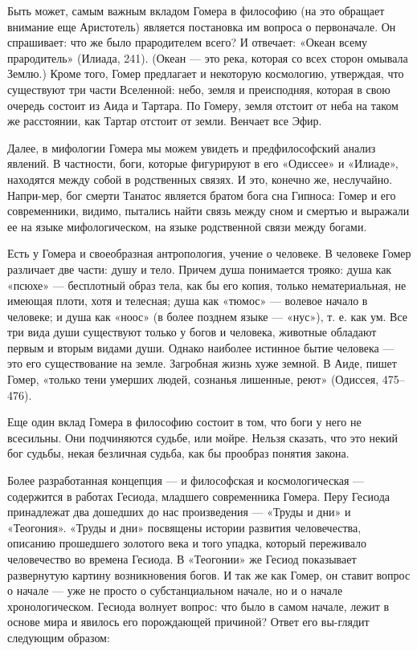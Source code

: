     \par Быть может, самым важным вкладом Гомера в философию (на это обращает внимание еще Аристотель) является постановка им вопроса о первоначале. Он спрашивает: что же было прародителем всего? И отвечает: «Океан всему прародитель» (Илиада, 241). (Океан — это река, которая со всех сторон омывала Землю.) Кроме того, Гомер предлагает и некоторую космологию, утверждая, что существуют три части Вселенной: небо, земля и преисподняя, которая в свою очередь состоит из Аида и Тартара. По Гомеру, земля отстоит от неба на таком же расстоянии, как Тартар отстоит от земли. Венчает все Эфир.
    
    \par Далее, в мифологии Гомера мы можем увидеть и предфилософский анализ явлений. В частности, боги, которые фигурируют в его «Одиссее» и «Илиаде», находятся между собой в родственных связях. И это, конечно же, неслучайно. Напри-мер, бог смерти Танатос является братом бога сна Гипноса: Гомер и его современники, видимо, пытались найти связь между сном и смертью и выражали ее на языке мифологическом, на языке родственной связи между богами.
    
    \par Есть у Гомера и своеобразная антропология, учение о человеке. В человеке Гомер различает две части: душу и тело. Причем душа понимается трояко: душа как «псюхе» — бесплотный образ тела, как бы его копия, только нематериальная, не имеющая плоти, хотя и телесная; душа как «тюмос» — волевое начало в человеке; и душа как «ноос» (в более позднем языке — «нус»), т. е. как ум. Все три вида души существуют только у богов и человека, животные обладают первым и вторым видами души. Однако наиболее истинное бытие человека — это его существование на земле. Загробная жизнь хуже земной. В Аиде, пишет Гомер, «только тени умерших людей, сознанья лишенные, реют» (Одиссея, 475–476). 
    
    \par Еще один вклад Гомера в философию состоит в том, что боги у него не всесильны. Они подчиняются судьбе, или мойре. Нельзя сказать, что это некий бог судьбы, некая безличная судьба, как бы прообраз понятия закона.
    
    \par Более разработанная концепция — и философская и космологическая — содержится в работах Гесиода, младшего современника Гомера. Перу Гесиода принадлежат два дошедших до нас произведения — «Труды и дни» и «Теогония». «Труды и дни» посвящены истории развития человечества, описанию прошедшего золотого века и того упадка, который переживало человечество во времена Гесиода. В «Теогонии» же Гесиод показывает развернутую картину возникновения богов. И так же как Гомер, он ставит вопрос о начале — уже не просто о субстанциальном начале, но и о начале хронологическом. Гесиода волнует вопрос: что было в самом начале, лежит в основе мира и явилось его порождающей причиной? Ответ его вы-глядит следующим образом: 
    \\
    
